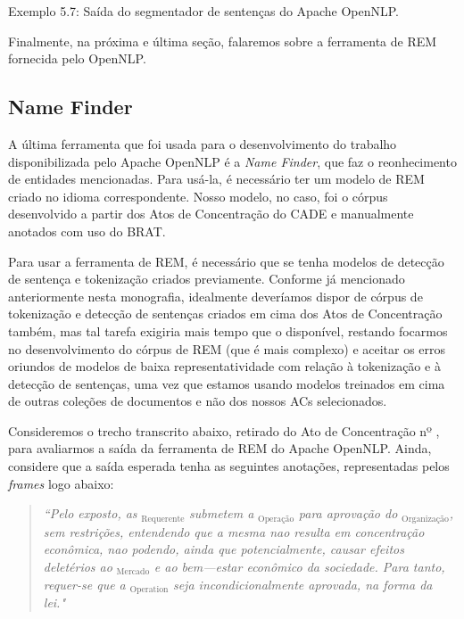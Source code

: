 \documentclass[11pt]{report}
\begin{document}
\begin{quote}
\end{quote}

\begin{center}
  Exemplo 5.7: Saída do segmentador de sentenças do Apache OpenNLP.
\end{center}

Finalmente, na próxima e última seção, falaremos sobre a ferramenta de REM fornecida pelo OpenNLP.

\pagebreak

\subsection{Name Finder}

\indent\indent A última ferramenta que foi usada para o desenvolvimento do trabalho disponibilizada pelo Apache OpenNLP é a \textit{Name Finder}, que faz o
reonhecimento de entidades mencionadas. Para usá-la, é necessário ter um modelo de REM criado no idioma correspondente. Nosso modelo, no caso, foi o córpus desenvolvido
a partir dos Atos de Concentração do CADE e manualmente anotados com uso do BRAT.

Para usar a ferramenta de REM, é necessário que se tenha modelos de detecção de sentença e tokenização criados previamente. Conforme já mencionado anteriormente nesta monografia,
idealmente deveríamos dispor de córpus de tokenização e detecção de sentenças criados em cima dos Atos de Concentração também, mas tal tarefa exigiria mais tempo que o
disponível, restando focarmos no desenvolvimento do córpus de REM (que é mais complexo) e aceitar os erros oriundos de modelos de baixa representatividade com relação
à tokenização e à detecção de sentenças, uma vez que estamos usando modelos treinados em cima de outras coleções de documentos e não dos nossos ACs selecionados.

Consideremos o trecho transcrito abaixo, retirado do Ato de Concentração nº , para avaliarmos a saída da ferramenta de REM do Apache OpenNLP. Ainda, considere
que a saída esperada tenha as seguintes anotações, representadas pelos \textit{frames} logo abaixo:

\begin{quote}
  \textit{``Pelo exposto, as }$_{\text{Requerente}}$\textit{ submetem a }$_{\text{Operação}}$\textit{ para aprovação do }$_{\text{Organização}}$\textit{, sem restrições,
  entendendo que a mesma nao resulta em
  concentração econômica, nao podendo, ainda que potencialmente, causar efeitos deletérios ao }$_{\text{Mercado}}$\textit{ e ao bem—estar econômico da sociedade.
  Para tanto, requer-se que a }$_{\text{Operation}}$\textit{ seja incondicionalmente aprovada, na forma da lei."}
\end{quote}
\end{document}
